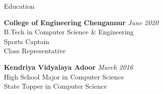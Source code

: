 \documentclass{resume} %
\begin{document}

\begin{rSection}{Education}

{\bf College of Engineering Chengannur} \hfill {\em June 2020} \\
B.Tech in Computer Science \& Engineering \\
Sports Captain \\
Class Representative

{\bf Kendriya Vidyalaya Adoor} \hfill {\em March 2016} \\
High School Major in Computer Science\\
State Topper in Computer Science\\
\end{rSection}

\end{document}
